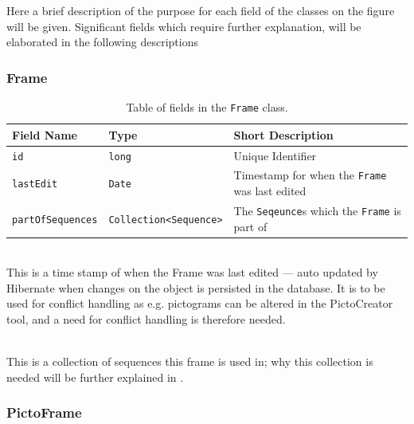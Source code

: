 Here a brief description of the purpose for each field of the classes on the figure will be given.
Significant fields which require further explanation, will be elaborated in the following descriptions

\subsubsection*{Frame}

\begin{table}[!h]
    \footnotesize
    \centering
    \begin{tabularx}{\textwidth}{ l l X }
        Field Name    & Type                                & Short Description                                \\
        \midrule
        \texttt{id}              & \texttt{long}                                      & Unique Identifier                                             \\
        \texttt{lastEdit}        & \texttt{Date}                                      & Timestamp for when the \texttt{Frame} was last edited  \\
        \texttt{partOfSequences} & \texttt{Collection\textless Sequence\textgreater}  & The \texttt{Seqeunce}s which the \texttt{Frame} is part of \\
    \end{tabularx}
    \caption{Table of fields in the \texttt{Frame} class.}
    \label{tbl:frame_class}
\end{table}

    \begin{description}[font=\ttfamily\bfseries]
        \item[lastEditAt] \hfill \\ This is a time stamp of when the Frame was last edited --- auto updated by Hibernate when changes on the object is persisted in the database.
        It is to be used for conflict handling as e.g. pictograms can be altered in the PictoCreator tool, and a need for conflict handling is therefore needed.
        \item[partofSequences] \hfill \\ This is a collection of sequences this frame is used in; why this collection is needed will be further explained in .
    \end{description}

\subsubsection*{PictoFrame}

